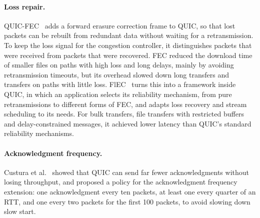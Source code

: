 \paragraph{Loss repair.} QUIC-FEC~\cite{michel2019quicfec} adds a forward erasure correction frame to QUIC, so that lost packets can be rebuilt from redundant data without waiting for a
retransmission. To keep the loss signal for the congestion
controller, it distinguishes packets that were received from packets that were
recovered. FEC reduced the download time of smaller files on paths with high loss and
long delays, mainly by avoiding retransmission timeouts, but its overhead slowed down
long transfers and transfers on paths with little loss. FlEC~\cite{michel2023flec}
turns this into a framework inside QUIC, in which an application selects its
reliability mechanism, from pure retransmissions to different forms of FEC, and adapts
loss recovery and stream scheduling to its needs. For bulk transfers, file transfers
with restricted buffers and delay-constrained messages, it achieved lower latency than
QUIC's standard reliability mechanisms.

\paragraph{Acknowledgment frequency.} Custura et al.~\cite{custura2023reducing} showed that QUIC can send far
fewer acknowledgments without losing throughput, and proposed a policy for the
acknowledgment frequency extension: one
acknowledgment every ten packets, at least one every quarter of an RTT, and one every
two packets for the first 100 packets, to avoid slowing down slow
start.


